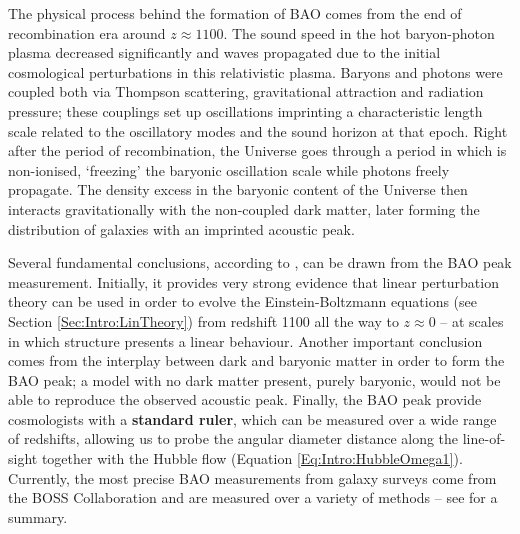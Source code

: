 \qquad The physical process behind the formation of BAO comes from the end of recombination era around $z \approx 1100$. The sound speed in the hot baryon-photon plasma decreased significantly and waves propagated due to the initial cosmological perturbations in this relativistic plasma. Baryons and photons were coupled both via Thompson scattering, gravitational attraction and radiation pressure; these couplings set up oscillations imprinting a characteristic length scale related to the oscillatory modes and the sound horizon at that epoch. Right after the period of recombination, the Universe goes through a period in which is non-ionised, `freezing' the baryonic oscillation scale while photons freely propagate. The density excess in the baryonic content of the Universe then interacts gravitationally with the non-coupled dark matter, later forming the distribution of galaxies with an imprinted acoustic peak.

\qquad Several fundamental conclusions, according to \cite{Einsenstein2005}, can be drawn from the BAO peak measurement. Initially, it provides very strong evidence that linear perturbation theory can be used in order to evolve the Einstein-Boltzmann equations (see Section \ref{Sec:Intro:LinTheory}) from redshift 1100 all the way to $z \approx 0$ -- at scales in which structure presents a linear behaviour. Another important conclusion comes from the interplay between dark and baryonic matter in order to form the BAO peak; a model with no dark matter present, purely baryonic, would not be able to reproduce the observed acoustic peak. Finally, the BAO peak provide cosmologists with a \textbf{standard ruler}, which can be measured over a wide range of redshifts, allowing us to probe the angular diameter distance along the line-of-sight together with the Hubble flow (Equation \ref{Eq:Intro:HubbleOmega1}). Currently, the most precise BAO measurements from galaxy surveys come from the BOSS Collaboration and are measured over a variety of methods -- see \citealt{2016BOSSCosmology} for a summary.

